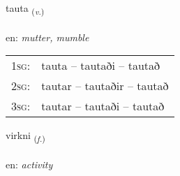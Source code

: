 \documentclass[frontgrid, backgrid]{flacards}\usepackage[]{graphicx}\usepackage[]{xcolor}
\begin{document}
\renewcommand{\blhead}{\vskip5pt {\small\bfseries\footnotesize Sagnorð | Verb }}
\renewcommand{\bcfoot}{\vskip5pt \hspace{2pt}{\small\bfseries\footnotesize 3K}}


{tauta \small{\textsubscript{(\textit{v.})}} \\[1ex] %
\textphonetic{[tʰœiːta]} \\
en: \emph{mutter, mumble} \\  [2ex]
\renewcommand*{\arraystretch}{0.8}
\begin{tabular}{p{1cm}l}
\textsc{1sg}: & tauta -- tautaði -- tautað \\ 
\textsc{2sg}: & tautar -- tautaðir -- tautað \\ 
\textsc{3sg}: & tautar -- tautaði -- tautað \\ 
\end{tabular}
}

\renewcommand{\flhead}{\vskip5pt \fboxsep=0pt {\small\bfseries\footnotesize Nafnorð | Noun}}
\renewcommand{\fcfoot}{\vskip5pt \fboxsep=0pt \hspace{2pt}{\small\bfseries\footnotesize 3K}}

\renewcommand{\blhead}{\vskip5pt {\small\bfseries\footnotesize Nafnorð | Noun }}
\renewcommand{\bcfoot}{\vskip5pt \hspace{2pt}{\small\bfseries\footnotesize 3K}}


{virkni \small{\textsubscript{(\textit{f.})}} \\[1ex] %
 \\
en: \emph{activity} \\  [2ex]
\renewcommand*{\arraystretch}{0.8}
}

\renewcommand{\flhead}{\vskip5pt \fboxsep=0pt {\small\bfseries\footnotesize Nafnorð | Noun}}
\renewcommand{\fcfoot}{\vskip5pt \fboxsep=0pt \hspace{2pt}{\small\bfseries\footnotesize 3K}}
\end{document}
